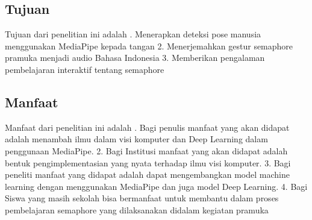\subsection{Tujuan}

Tujuan dari penelitian ini adalah .	Menerapkan deteksi pose manusia menggunakan MediaPipe kepada tangan
2.	Menerjemahkan gestur semaphore pramuka menjadi audio Bahasa Indonesia
3.	Memberikan pengalaman pembelajaran interaktif tentang semaphore


\subsection{Manfaat}

Manfaat dari penelitian ini adalah .	Bagi penulis manfaat yang akan didapat adalah menambah ilmu dalam visi komputer dan Deep Learning dalam penggunaan MediaPipe.
2.	Bagi Institusi manfaat yang akan didapat adalah bentuk pengimplementasian yang nyata terhadap ilmu visi komputer.
3.	Bagi peneliti manfaat yang didapat adalah dapat mengembangkan model machine learning dengan menggunakan MediaPipe dan juga model Deep Learning.
4.	Bagi Siswa yang masih sekolah bisa bermanfaat untuk membantu dalam proses pembelajaran semaphore yang dilaksanakan didalam kegiatan pramuka

